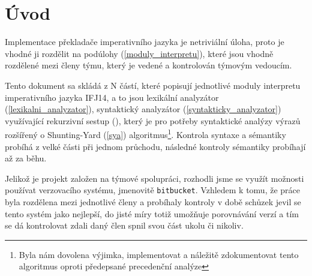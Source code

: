 \documentclass[12pt,a4paper,titlepage,final]{article}
\begin{document}

\def\author{xxx}
\def\email{xxx@stud.fit.vutbr.cz}
\def\projname{Implementace interpretu imperativního jazyka IFJ14}



\pagestyle{plain}
\setcounter{page}{1}
\tableofcontents

\newpage
\pagestyle{plain}
\setcounter{page}{1}

\section{Úvod} \label{uvod}
Implementace překladače imperativního jazyka je netriviální úloha, proto je
vhodné ji rozdělit na podúlohy (\ref{moduly_interpretu}), které jsou vhodně
rozdělené mezi členy týmu, který je vedené a kontrolován týmovým vedoucím.

Tento dokument sa skládá z N částí, které popisují jednotlivé moduly
interpretu imperativního jazyka IFJ14, a to jsou lexikální analyzátor
(\ref{lexikalni_analyzator}), syntaktický analyzátor (\ref{syntakticky_analyzator})
využívající rekurzivní sestup (), který je pro potřeby syntaktické
analýzy výrazů rozšířený o Shunting-Yard (\ref{sya}) algoritmus\footnote{Byla nám
dovolena výjimka, implementovat a náležitě zdokumentovat tento algoritmus oproti předepsané
precedenční analýze}. Kontrola syntaxe a sémantiky probíhá z velké části při jednom
průchodu, následné kontroly sémantiky probíhají až za běhu.\newline

Jelikož je projekt založen na týmové spolupráci, rozhodli jsme se využít možnosti používat verzovacího systému, jmenovitě \verb|bitbucket|. Vzhledem k tomu, že práce byla rozdělena mezi jednotlivé členy a probíhaly kontroly v době schůzek jevil se tento systém jako nejlepší, do jisté míry totiž umožňuje porovnávání verzí a tím se dá kontrolovat zdali daný člen spnil svou část ukolu či nikoliv.
\end{document}
